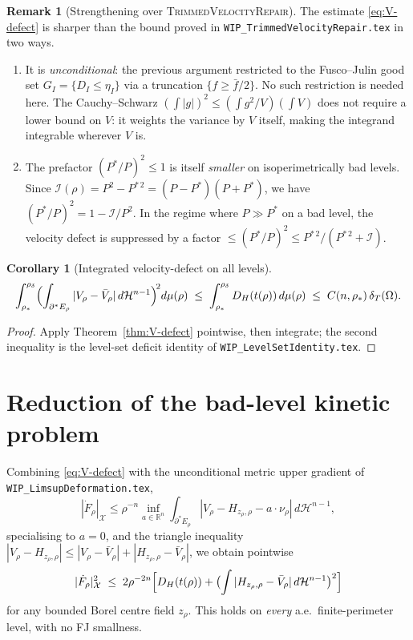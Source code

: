 \documentclass[11pt]{article}
\newtheorem{corollary}[theorem]{Corollary}
\theoremstyle{definition}
\newtheorem{remark}[theorem]{Remark}
\newcommand{\R}{\mathbb{R}}
\newcommand{\Om}{\Omega}
\newcommand{\rstar}{\rho_{*}}
\newcommand{\rdel}{\rho_\delta}
\newcommand{\Hn}{\mathcal H^{n-1}}
\newcommand{\X}{\mathcal X}
\begin{document}
\begin{remark}[Strengthening over \textsc{TrimmedVelocityRepair}]
\label{rem:strengthen}
The estimate \eqref{eq:V-defect} is sharper than the bound proved in
\texttt{WIP\_TrimmedVelocityRepair.tex} in two ways.
\begin{enumerate}
\item It is \emph{unconditional}: the previous argument restricted to
the Fusco--Julin good set $G_I=\{D_I\le\eta_I\}$ via a truncation
$\{f\ge\bar f/2\}$.  No such restriction is needed here.  The
Cauchy--Schwarz $(\int|g|)^{2}\le(\int g^{2}/V)(\int V)$ does not
require a lower bound on $V$: it weights the variance by $V$ itself,
making the integrand integrable wherever $V$ is.
\item The prefactor $(P^{*}/P)^{2}\le 1$ is itself \emph{smaller}
on isoperimetrically bad levels.  Since
$\mathcal I(\rho)=P^{2}-P^{*\,2}=(P-P^{*})(P+P^{*})$, we have
$(P^{*}/P)^{2}=1-\mathcal I/P^{2}$.  In the regime where
$P\gg P^{*}$ on a bad level, the velocity defect is suppressed by
a factor $\le (P^{*}/P)^{2}\le P^{*\,2}/(P^{*\,2}+\mathcal I)$.
\end{enumerate}
\end{remark}

\begin{corollary}[Integrated velocity-defect on all levels]
\label{cor:V-integrated}
\begin{equation}\label{eq:V-integrated}
   \int_{\rstar}^{\rdel}\Bigl(\int_{\partial^{*}E_\rho}|V_\rho-\bar V_\rho|\,d\Hn\Bigr)^{\!2}d\mu(\rho)
   \;\le\;\int_{\rstar}^{\rdel}D_H(t(\rho))\,d\mu(\rho)
   \;\le\;C(n,\rstar)\,\delta_T(\Om).
\end{equation}
\end{corollary}

\begin{proof}
Apply Theorem~\ref{thm:V-defect} pointwise, then integrate; the second
inequality is the level-set deficit identity of
\texttt{WIP\_LevelSetIdentity.tex}.
\end{proof}

\section{Reduction of the bad-level kinetic problem}\label{sec:reduction}

Combining \eqref{eq:V-defect} with the unconditional metric upper
gradient of \texttt{WIP\_LimsupDeformation.tex},
\[
   |\dot F_\rho|_\X
   \le \rho^{-n}\inf_{a\in\R^{n}}\int_{\partial^{*}E_\rho}
       |V_\rho-H_{z_\rho,\rho}-a\cdot\nu_\rho|\,d\Hn,
\]
specialising to $a=0$, and the triangle inequality
$|V_\rho-H_{z_\rho,\rho}|\le|V_\rho-\bar V_\rho|+|H_{z_\rho,\rho}-\bar V_\rho|$,
we obtain pointwise
\begin{equation}\label{eq:Fdot-decomp-uncon}
   |\dot F_\rho|_\X^{2}
   \;\le\;2\rho^{-2n}\Bigl[D_H(t(\rho))
   +\bigl(\int|H_{z_\rho,\rho}-\bar V_\rho|\,d\Hn\bigr)^{2}\Bigr]
\end{equation}
for any bounded Borel centre field $z_\rho$.  This holds on
\emph{every} a.e.\ finite-perimeter level, with no FJ smallness.
\end{document}
